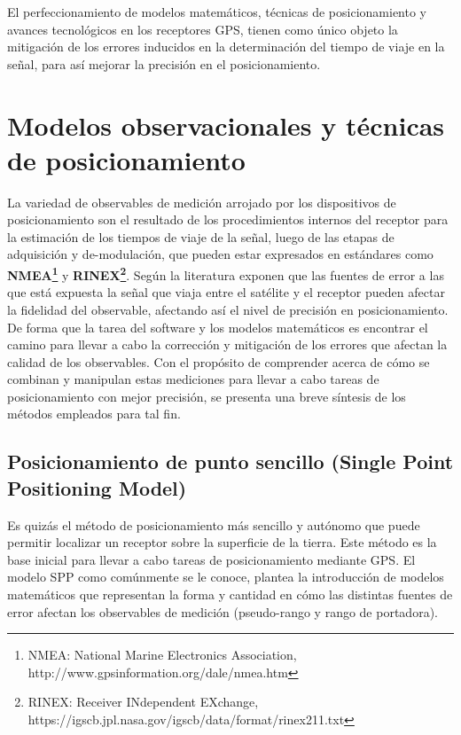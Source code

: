 El perfeccionamiento de modelos matemáticos, técnicas de posicionamiento y avances tecnológicos en los receptores GPS, tienen como único objeto la mitigación de los errores inducidos en la determinación del tiempo de viaje en la señal, para así mejorar la precisión en el posicionamiento.\\

\section{Modelos observacionales y técnicas de posicionamiento}

La variedad de observables de medición arrojado por los dispositivos de posicionamiento son el resultado de los procedimientos internos del receptor para la estimación de los tiempos de viaje de la señal, luego de las etapas de adquisición y de-modulación, que pueden estar expresados en estándares como \textbf{NMEA\footnote{NMEA: National Marine Electronics Association,  http://www.gpsinformation.org/dale/nmea.htm}} y \textbf{RINEX\footnote{RINEX: Receiver INdependent EXchange, https://igscb.jpl.nasa.gov/igscb/data/format/rinex211.txt}}. Según la literatura exponen que las fuentes de error a las que está expuesta la señal que viaja entre el satélite y el receptor pueden afectar la fidelidad del observable, afectando así el nivel de precisión en posicionamiento.\\

De forma que la tarea del software y los modelos matemáticos es encontrar el camino para llevar a cabo la corrección y mitigación de los errores que afectan la calidad de los observables. Con el propósito de comprender acerca de cómo se combinan y manipulan estas mediciones para llevar a cabo tareas de posicionamiento con mejor precisión, se presenta una breve síntesis de los métodos empleados para tal fin.\\


\subsection{Posicionamiento de punto sencillo (Single Point Positioning Model)}

Es quizás el método de posicionamiento más sencillo y autónomo que puede permitir localizar un receptor sobre la superficie de la tierra. Este método es la base inicial para llevar a cabo tareas de posicionamiento mediante GPS. El modelo SPP como comúnmente se le conoce, plantea la introducción de modelos matemáticos que representan la forma y cantidad en cómo las distintas fuentes de error afectan los observables de medición (pseudo-rango y rango de portadora).\\

